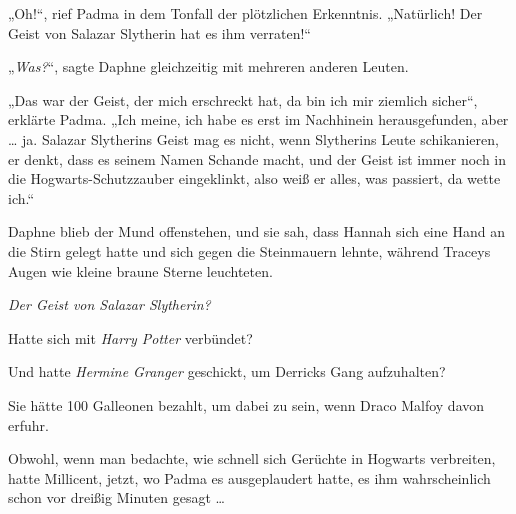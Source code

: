 „Oh!“, rief Padma in dem Tonfall der plötzlichen Erkenntnis.
„Natürlich! Der Geist von Salazar Slytherin hat es ihm verraten!“

„\emph{Was?}“, sagte Daphne gleichzeitig mit mehreren anderen Leuten.

„Das war der Geist, der mich erschreckt hat, da bin ich mir ziemlich sicher“, erklärte Padma.
„Ich meine, ich habe es erst im Nachhinein herausgefunden, aber … ja. Salazar Slytherins Geist mag es nicht, wenn Slytherins Leute schikanieren, er denkt, dass es seinem Namen Schande macht, und der Geist ist immer noch in die Hogwarts-Schutzzauber eingeklinkt, also weiß er alles, was passiert, da wette ich.“

Daphne blieb der Mund offenstehen, und sie sah, dass Hannah sich eine Hand an die Stirn gelegt hatte und sich gegen die Steinmauern lehnte, während Traceys Augen wie kleine braune Sterne leuchteten.

\emph{Der Geist von Salazar Slytherin?}

Hatte sich mit \emph{Harry Potter} verbündet?

Und hatte \emph{Hermine Granger} geschickt, um Derricks Gang aufzuhalten?

Sie hätte 100 Galleonen bezahlt, um dabei zu sein, wenn Draco Malfoy davon erfuhr.

Obwohl, wenn man bedachte, wie schnell sich Gerüchte in Hogwarts verbreiten, hatte Millicent, jetzt, wo Padma es ausgeplaudert hatte, es ihm wahrscheinlich schon vor dreißig Minuten gesagt …

